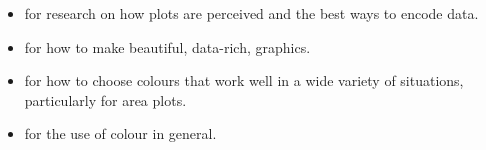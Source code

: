 \begin{itemize}
  \item \citet{cleveland:1993,cleveland:1987,cleveland:1994} for research on how plots are perceived and the best ways to encode data.
  \item \citet{tufte:2006,tufte:1990,tufte:1997,tufte:2001} for how to make beautiful, data-rich, graphics.
  \item \citet{brewer:1994,brewer:1994a} for how to choose colours that work well in a wide variety of situations, particularly for area plots.
  \item \citet{carr:1999,carr:1994,carr:2002} for the use of colour in general.
\end{itemize}


